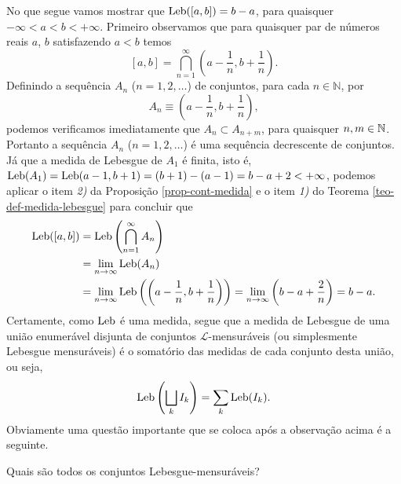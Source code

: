         \medskip 
    
        No que segue vamos mostrar que $\mathrm{Leb}([a,b])=b-a$,
        para quaisquer $-\infty<a<b<+\infty$. 
        Primeiro observamos que para quaisquer 
        par de números reais $a$, $b$ satisfazendo $a<b$ temos 
        \[
            [a,b] = \bigcap_{n=1}^{\infty} \left(a-\frac{1}{n}, b+\frac{1}{n}\right).
        \]
        Definindo a sequência $A_n$ ($n=1,2,\ldots$) de conjuntos, 
        para cada $n\in\mathbb{N}$, por 
        \[
            A_n\equiv  \left(a-\frac{1}{n},b+\frac{1}{n}\right),
        \]
        podemos verificamos imediatamente que $A_n\subset A_{n+m}$, 
        para quaisquer $n,m\in\mathbb{N}$. Portanto a sequência $A_n$ ($n=1,2,\ldots$) 
        é uma sequência decrescente de conjuntos. 
        Já que a medida de Lebesgue de $A_1$ é finita, isto é, 
        $\mathrm{Leb}(A_1) = \mathrm{Leb}(a-1,b+1) = (b+1)-(a-1) = b-a+2<+\infty$, 
        podemos aplicar
        o item {\it 2)} da Proposição \ref{prop-cont-medida} 
        e o item {\it 1)} do Teorema \ref{teo-def-medida-lebesgue}  
        para concluir que
        \begin{align*}
           \mathrm{Leb}([a,b]) 
           &= 
           \mathrm{Leb}\left( \bigcap_{n=1}^{\infty} A_n  \right)
           \\
           &= \lim_{n\to \infty} \mathrm{Leb}(A_n)
           \\
           &=
           \lim_{n\to \infty} 
           \mathrm{Leb}\left( \left(a-\frac{1}{n},b+\frac{1}{n}\right)\right)
           =
           \lim_{n\to \infty} \left( b-a+\frac{2}{n} \right) 
           =
           b-a.
        \end{align*}
        Certamente, como $\mathrm{Leb}$ é uma medida, segue que a medida de 
        Lebesgue de uma união enumerável disjunta de conjuntos 
        $\mathscr{L}$-mensuráveis (ou simplesmente Lebesgue mensuráveis) 
        é o somatório das medidas de cada conjunto desta união, ou seja,
        $$
          \mathrm{Leb}\left( \bigsqcup_k I_k \right) = \sum_k \mathrm{Leb}(I_k).
        $$
        Obviamente uma questão importante que se coloca após 
        a observação acima é a seguinte. 
        \begin{center}
            Quais são todos os conjuntos Lebesgue-mensuráveis?
        \end{center}
        
